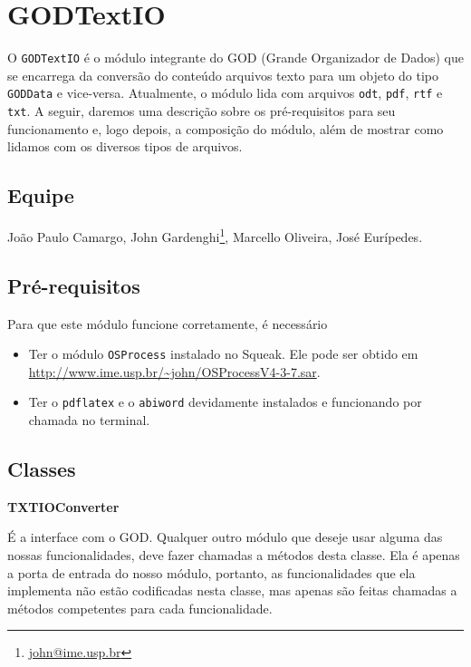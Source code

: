 \section{GODTextIO}

O \verb|GODTextIO| é o módulo integrante do GOD (Grande Organizador de
Dados) que se encarrega da conversão do conteúdo arquivos texto para
um objeto do tipo \verb|GODData| e vice-versa. Atualmente, o módulo
lida com arquivos \verb|odt|, \verb|pdf|, \verb|rtf| e \verb|txt|. A
seguir, daremos uma descrição sobre os pré-requisitos para seu
funcionamento e, logo depois, a composição do módulo, além de mostrar
como lidamos com os diversos tipos de arquivos.

\subsection{Equipe}

João Paulo Camargo, John
Gardenghi\footnote{\href{mailto:john@ime.usp.br}{john@ime.usp.br}},
Marcello Oliveira, José Eurípedes.


\subsection{Pré-requisitos}

Para que este módulo funcione corretamente, é necessário
\begin{itemize}
\item Ter o módulo \verb|OSProcess| instalado no Squeak. Ele pode ser
  obtido em \url{http://www.ime.usp.br/~john/OSProcessV4-3-7.sar}.
\item Ter o \verb|pdflatex| e o \verb|abiword| devidamente instalados
  e funcionando por chamada no terminal.
\end{itemize}

\subsection{Classes}

\vspace{1em}
\textbf{TXTIOConverter}

É a interface com o GOD. Qualquer outro módulo que deseje usar alguma
das nossas funcionalidades, deve fazer chamadas a métodos desta
classe. Ela é apenas a porta de entrada do nosso módulo, portanto, as
funcionalidades que ela implementa não estão codificadas nesta classe,
mas apenas são feitas chamadas a métodos competentes para cada
funcionalidade.

